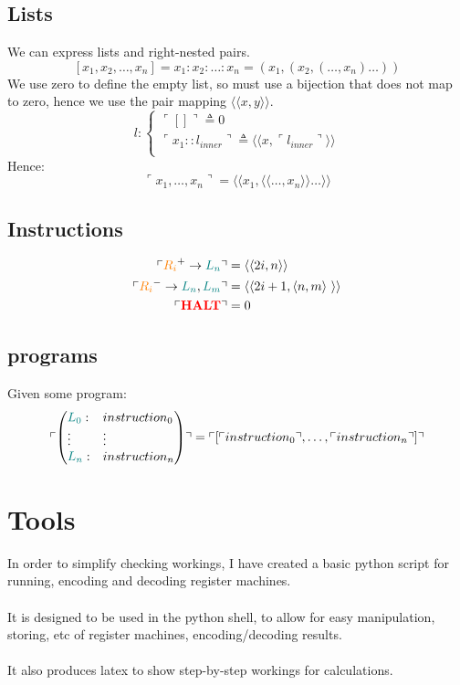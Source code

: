 \documentclass{report}
\begin{document}
\subsection*{Lists}
We can express lists and right-nested pairs.
\[[x_1, x_2, \dots, x_n] = x_1:x_2:\dots:x_n = (x_1, (x_2, (\dots, x_n) \dots ))\]
We use zero to define the empty list, so must use a bijection that does not map to zero, hence we use the pair mapping $\langle\langle x,y \rangle\rangle$.
\[l : \begin{cases}
		\ulcorner [] \urcorner \triangleq 0                                                                            \\
		\ulcorner x_1 :: l_{inner} \urcorner \triangleq \langle\langle x, \ulcorner l_{inner} \urcorner \rangle\rangle \\
	\end{cases}\]
Hence:
\[\ulcorner x_1, \dots, x_n \urcorner = \langle\langle x_1 , \langle\langle \dots, x_n\rangle\rangle \dots \rangle\rangle\]
\subsection*{Instructions}
\[\begin{split}
		\ulcorner \text{\textcolor{orange}{$R_{i}$}}^+ \to \text{\textcolor{teal}{$L_{n}$}} \urcorner &= \langle\langle 2i, n \rangle\rangle \\
		\ulcorner \text{\textcolor{orange}{$R_{i}$}}^- \to \text{\textcolor{teal}{$L_{n}$}}, \text{\textcolor{teal}{$L_{m}$}} \urcorner &= \langle\langle 2i + 1, \langle n,m \rangle \  \rangle\rangle \\
		\ulcorner \text{\textcolor{red}{\textbf{HALT}}} \urcorner &= 0 \\
	\end{split}\]
\subsection*{programs}
Given some program:
\[\ulcorner \left( \begin{matrix*}[l]
			\instr{0}{instruction_0}
			\vdots & \vdots \\
			\instr{n}{instruction_n}
		\end{matrix*} \right) \urcorner = \ulcorner [\ulcorner instruction_0 \urcorner, \dots, \ulcorner instruction_n \urcorner] \urcorner\]
\section*{Tools}
In order to simplify checking workings, I have created a basic python script for running, encoding and decoding register machines.
\\
\\ It is designed to be used in the python shell, to allow for easy manipulation, storing, etc of register machines, encoding/decoding results.
\\
\\ It also produces latex to show step-by-step workings for calculations.
\end{document}

